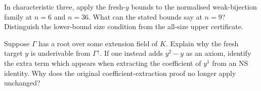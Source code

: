 \begin{exercise}\label{tx:ex:fresh-window}
In characteristic three, apply the fresh-$y$ bounds to the normalised
weak-bijection family at $n=6$ and $n=36$. What can the stated bounds
say at $n=9$? Distinguish the lower-bound size condition from the
all-size upper certificate.
\end{exercise}
\par\medskip

\begin{exercise}\label{tx:ex:fresh-soundness}
Suppose $\Gamma$ has a root over some extension field of $K$. Explain
why the fresh target $y$ is underivable from $\Gamma^\uparrow$.
If one instead adds $y^2-y$ as an axiom, identify the extra term which
appears when extracting the coefficient of $y^1$ from an NS identity.
Why does the original coefficient-extraction proof no longer apply
unchanged?
\end{exercise}
\par\medskip

